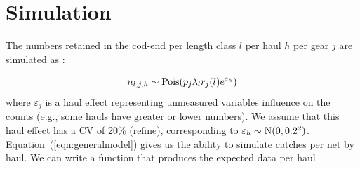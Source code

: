 \documentclass[12pt]{article}\usepackage[]{graphicx}\usepackage[]{color}
\begin{document}
\section{Simulation}
The numbers retained in the cod-end per length class $l$ per haul $h$ per gear $j$ are simulated as \citep{Millar:Fryer:1999}:

\begin{equation}
n_{l, j, h} \sim \textnormal{Pois}(p_j \lambda_l r_j(l) e^{\varepsilon_h})
\label{eqn:generalmodel}
\end{equation}
where $\varepsilon_j$ is a haul effect representing unmeasured variables influence on the counts (e.g., some hauls have greater or lower numbers). We assume that this haul effect has a CV of 20\% (refine), corresponding to $\varepsilon_h \sim \textnormal{N}(0, 0.2^2)$. Equation~(\ref{eqn:generalmodel}) gives us the ability to simulate catches per net by haul. We can write a function that produces the expected data per haul
\end{document}
